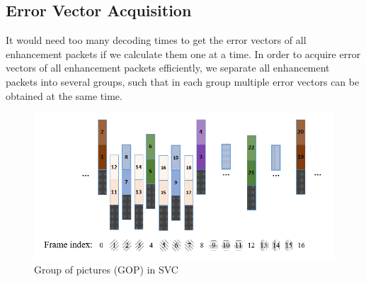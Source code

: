 \documentclass[journal]{IEEEtran}
\begin{document}
\subsection{Error Vector Acquisition}
\label{subsec:error-vector}

It would need too many decoding times to get the error vectors of all enhancement packets if we calculate them one at a time. In order to acquire error vectors of all enhancement packets efficiently, we separate all enhancement packets into several groups, such that in each group multiple error vectors can be obtained at the same time.
 
\begin{figure}[h]
\centering
\includegraphics[width = 0.9\linewidth]{GOP-Structure.png}
\caption{Group of pictures (GOP) in SVC \label{fig:GOP_Structure}}
\end{figure}
 
\end{document}
